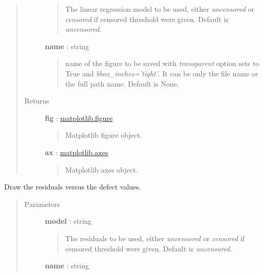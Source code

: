 \documentclass[letterpaper,10pt,english]{sphinxmanual}
\begin{document}
\begin{fulllineitems}
\begin{fulllineitems}
\begin{quote}
\begin{description}
\begin{quote}
The linear regression model to be used, either \emph{uncensored} or
\emph{censored} if censored threshold were given. Default is \emph{uncensored}.
\end{quote}

\textbf{name} : string
\begin{quote}

name of the figure to be saved with \emph{transparent} option sets to True
and \emph{bbox\_inches='tight'}. It can be only the file name or the 
full path name. Default is None.
\end{quote}

\item[{Returns}] \leavevmode
\textbf{fig} : \href{http://matplotlib.org/api/figure\_api.html}{matplotlib.figure}
\begin{quote}

Matplotlib figure object.
\end{quote}

\textbf{ax} : \href{http://matplotlib.org/api/axes\_api.html}{matplotlib.axes}
\begin{quote}

Matplotlib axes object.
\end{quote}

\end{description}\end{quote}

\end{fulllineitems}


\begin{fulllineitems}
\label{_generated/otpod.UnivariateLinearModelAnalysis:otpod.UnivariateLinearModelAnalysis.drawResiduals}
Draw the residuals versus the defect values.
\begin{quote}\begin{description}
\item[{Parameters}] \leavevmode
\textbf{model} : string
\begin{quote}

The residuals to be used, either \emph{uncensored} or
\emph{censored} if censored threshold were given. Default is \emph{uncensored}.
\end{quote}

\textbf{name} : string
\begin{quote}


\end{quote}
\end{description}
\end{quote}
\end{fulllineitems}
\end{fulllineitems}
\end{document}
